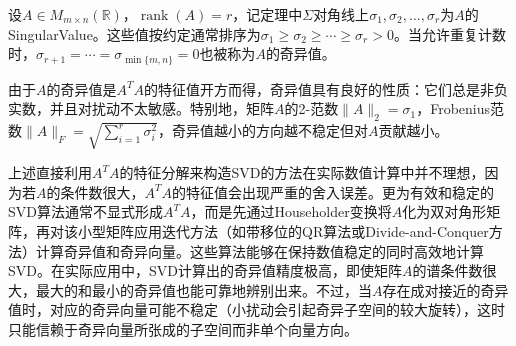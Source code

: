 \begin{definition}
	设$A\in M_{m\times n}(\mathbb{R})$，$\operatorname{rank}(A)=r$，记定理中$\Sigma$对角线上$\sigma_1,\sigma_2,\dots,\sigma_r$为$A$的\gls{SingularValue}。这些值按约定通常排序为$\sigma_1\ge \sigma_2\ge \cdots \ge \sigma_r>0$。当允许重复计数时，$\sigma_{r+1}=\cdots=\sigma_{\min\{m,n\}}=0$也被称为$A$的奇异值。
\end{definition}

由于$A$的奇异值是$A^T A$的特征值开方而得，奇异值具有良好的性质：它们总是非负实数，并且对扰动不太敏感。特别地，矩阵$A$的2-范数$\|A\|_2=\sigma_1$，Frobenius范数$\|A\|_F=\sqrt{\sum_{i=1}^r \sigma_i^2}$，奇异值越小的方向越不稳定但对$A$贡献越小。


\begin{note}
	上述直接利用$A^T A$的特征分解来构造SVD的方法在实际数值计算中并不理想，因为若$A$的条件数很大，$A^T A$的特征值会出现严重的舍入误差。更为有效和稳定的SVD算法通常不显式形成$A^T A$，而是先通过Householder变换将$A$化为双对角形矩阵，再对该小型矩阵应用迭代方法（如带移位的QR算法或Divide-and-Conquer方法）计算奇异值和奇异向量。这些算法能够在保持数值稳定的同时高效地计算SVD。在实际应用中，SVD计算出的奇异值精度极高，即使矩阵$A$的谱条件数很大，最大的和最小的奇异值也能可靠地辨别出来。不过，当$A$存在成对接近的奇异值时，对应的奇异向量可能不稳定（小扰动会引起奇异子空间的较大旋转），这时只能信赖于奇异向量所张成的子空间而非单个向量方向。
\end{note}

